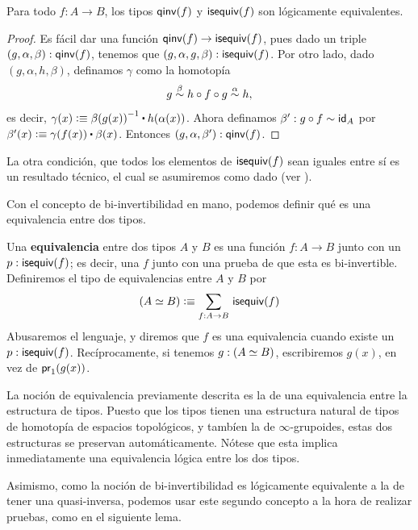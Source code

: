 \documentclass[../main.tex]{subfiles}
\begin{document}
\begin{proposition}
  Para todo $f:A \to B$, los tipos $\qinv(f)$ y $\isequiv(f)$ son l\'ogicamente equivalentes.
\end{proposition}
\begin{proof}
  Es f\'acil dar una función $\qinv(f) \to \isequiv(f)$, pues dado un triple $(g,\alpha,\beta):\qinv(f)$, tenemos que $(g,\alpha,g,\beta): \isequiv(f)$.
  Por otro lado, dado $(g,\alpha,h,\beta)$, definamos $\gamma$ como la homotop\'ia
  \vspace{-.8em}
  \[ g \overset{\beta}{\htpy} h\circ f\circ g \overset{\alpha}{\htpy} h, \]
  es decir, $\gamma(x) \defeq \opp{\beta(g(x))} \ct \ap{h}{\alpha(x)}$.
  Ahora definamos $\beta':g\circ f\htpy \idfunc[A]$ por $\beta'(x) \defeq \gamma(f(x)) \ct \beta(x)$.
  Entonces $(g,\alpha,\beta'):\qinv(f)$.
\end{proof}

La otra condici\'on, que todos los elementos de $\isequiv(f)$ sean iguales entre s\'i es un resultado t\'ecnico, el cual se asumiremos como dado (ver \cite[Secci\'on 4.3]{the_univalent_foundations_program_homotopy_2013}).

Con el concepto de bi-invertibilidad en mano, podemos definir qu\'e es una equivalencia entre dos tipos.

\begin{definition}
  Una \textbf{equivalencia} entre dos tipos $A$ y $B$ es una función $f: A \to B$ junto con un $p: \isequiv(f)$; es decir, una $f$ junto con una prueba de que esta es bi-invertible.
  Definiremos el tipo de equivalencias entre $A$ y $B$ por
  \[ (\eqv A B) \defeq \sm{f:A\to B} \isequiv(f)\]
  Abusaremos el lenguaje, y diremos que $f$ es una equivalencia cuando existe un $p: \isequiv(f)$. Rec\'iprocamente, si tenemos $g:(\eqv A B)$, escribiremos $g(x)$, en vez de $\fst (g (x))$.
\end{definition}

La noción de equivalencia previamente descrita es la de una equivalencia entre la estructura de tipos.
Puesto que los tipos tienen una estructura natural de tipos de homotop\'ia de espacios topol\'ogicos, y tamb\'ien la de $\infty$-grupoides, estas dos estructuras se preservan autom\'aticamente.
N\'otese que esta implica inmediatamente una equivalencia l\'ogica entre los dos tipos.

Asimismo, como la noci\'on de bi-invertibilidad es l\'ogicamente equivalente a la de tener una quasi-inversa, podemos usar este segundo concepto a la hora de realizar pruebas, como en el siguiente lema.
\end{document}
